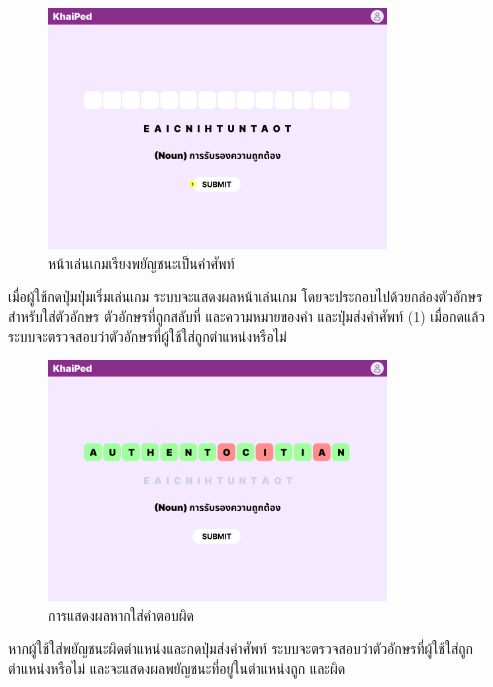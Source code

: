 \documentclass[12pt,oneside,openright,a4paper]{cpe-thai-project}
\begin{document}
\begin{figure}[!h]\centering
	\includegraphics[width=0.8\textwidth, keepaspectratio=true]{image/chap3/ui/game/Word Scramble - Start.png}
	\caption{หน้าเล่นเกมเรียงพยัญชนะเป็นคำศัพท์}\label{fig:UI_StartGame}
\end{figure}
\hspace{1cm}
เมื่อผู้ใช้กดปุ่มปุ่มเริ่มเล่นเกม ระบบจะแสดงผลหน้าเล่นเกม โดยจะประกอบไปด้วยกล่องตัวอักษร สำหรับใส่ตัวอักษร ตัวอักษรที่ถูกสลับที่
และความหมายของคำ และปุ่มส่งคำศัพท์ (1) เมื่อกดแล้วระบบจะตรวจสอบว่าตัวอักษรที่ผู้ใช้ใส่ถูกตำแหน่งหรือไม่

\pagebreak
\begin{figure}[!h]\centering
	\includegraphics[width=0.8\textwidth, keepaspectratio=true]{image/chap3/ui/game/Word Scramble - Wrong Answer.png}
	\caption{การแสดงผลหากใส่คำตอบผิด}\label{fig:UI_GameWrong}
\end{figure}
\hspace{1cm}
หากผู้ใช้ใส่พยัญชนะผิดตำแหน่งและกดปุ่มส่งคำศัพท์ ระบบจะตรวจสอบว่าตัวอักษรที่ผู้ใช้ใส่ถูกตำแหน่งหรือไม่ และจะแสดงผลพยัญชนะที่อยู่ในตำแหน่งถูก และผิด
\end{document}
